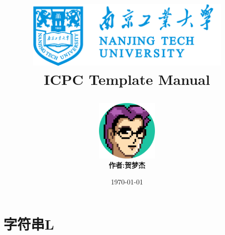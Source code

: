 \documentclass[10pt,a4paper,oneside]{book}
\title{
    \begin{center}
        \includegraphics[width=4in]{logo.png}
        \\ 
        \textbf{ICPC Template Manual}
    \end{center}
}
\author{
    \includegraphics[width=3cm]{author.png}
    \\
    \textbf{作者:贺梦杰}
}
\date{\today}
\begin{document}
    \maketitle
    \tableofcontents




    \chapter{字符串L}
    
    
    
    



\end{document}
